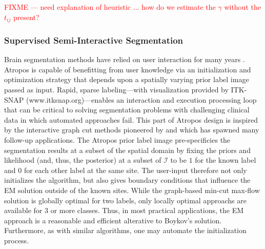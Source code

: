 \documentclass[11pt,english]{article}
\begin{document}
{\textcolor{red}{FIXME --- need explanation of heuristic ... how do we
  estimate the $\gamma$ without the $t_{ij}$ present?}

\subsubsection{Supervised Semi-Interactive Segmentation}
Brain segmentation methods have relied on user interaction for many
years \citep{Lim1989,Julin1997,Freeborough1997a,Yushkevich2006}.
Atropos is capable of benefitting from user knowledge via an
initialization and optimization strategy that depends upon a spatially
varying prior label image passed as input.  Rapid, sparse
labeling---with visualization provided by ITK-SNAP
(www.itksnap.org)---enables an interaction and execution processing
loop that can be critical to solving segmentation problems with
challenging clinical data in which automated approaches fail.  This
part of Atropos design is inspired by the interactive graph cut methods
pioneered by \cite{Boykov2001} and which has spawned many follow-up
applications.  The Atropos prior label
image pre-specificies the segmentation results at a subset of the
spatial domain by fixing the priors and likelihood (and, thus, the
posterior) at a subset of $\mathcal{I}$ to be $1$ for the known label
and $0$ for each other label at the same site.  The user-input
therefore not only initializes the algorithm, but also gives boundary conditions
that influence the EM solution outside of the known sites.  While the
graph-based min-cut max-flow solution is globally optimal for two
labels, only locally optimal approachs are available for 3 or more
classes.  Thus, in most practical applications, the EM approach is a
reasonable and efficient alterative to Boykov's solution.
Furthermore, as with similar algorithms, one may automate the
initialization process. 


}
\end{document}
